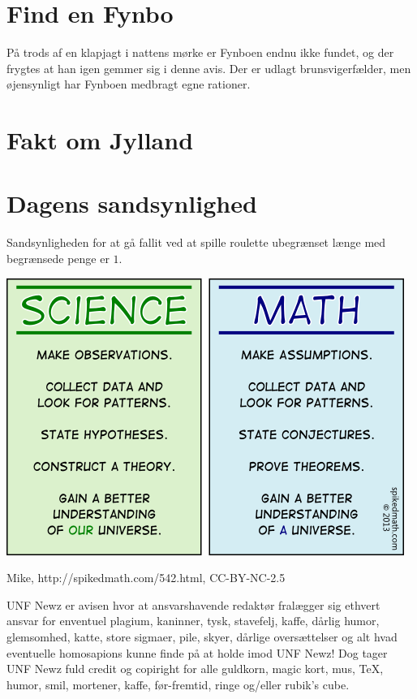 \begin{minipage}[b]{0.95\linewidth}
\begin{minipage}[t]{0.47\textwidth}
\section*{Find en Fynbo}
På trods af en klapjagt i nattens mørke er Fynboen endnu ikke fundet, og der frygtes at han igen gemmer sig i denne avis. Der er udlagt brunsvigerfælder, men øjensynligt har Fynboen medbragt egne rationer.

\section*{Fakt om Jylland}

\section*{Dagens sandsynlighed}
Sandsynligheden for at gå fallit ved at spille roulette ubegrænset længe med begrænsede penge er $1$.

\vspace{3mm}
\end{minipage}

\includegraphics[width=\textwidth]{542-science-vs-math.png}
\begin{center}
\tiny Mike, http://spikedmath.com/542.html, CC-BY-NC-2.5

\vspace{3mm}

\tiny UNF Newz er avisen hvor at ansvarshavende redaktør fralægger sig ethvert ansvar for enventuel plagium, kaninner, tysk, stavefelj, kaffe, dårlig humor, glemsomhed, katte, store sigmaer, pile, skyer, dårlige oversættelser og alt hvad eventuelle homosapions kunne finde på at holde imod UNF Newz! Dog tager UNF Newz fuld credit og copiright for alle guldkorn, magic kort, mus, TeX, humor, smil, mortener, kaffe, før-fremtid, ringe og/eller rubik's cube.
\end{center}
\end{minipage}

